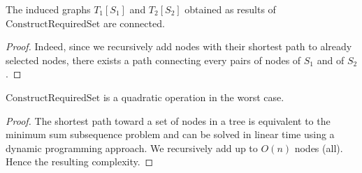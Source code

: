    			\begin{proposition}\label{prop:constructFuncConnected}
   				The induced graphs $T_1[S_1]$ and $T_2[S_2]$ obtained as results of $\text{ConstructRequiredSet}$ are connected.
   			\end{proposition}
   			\begin{proof}
   				Indeed, since we recursively add nodes with their shortest path to already selected nodes, there exists a path connecting every pairs of nodes of $S_1$ and of $S_2$.
   			\end{proof}
   
   			\begin{proposition}\label{prop:constructFuncQuadratic}
   				$\text{ConstructRequiredSet}$ is a quadratic operation in the worst case.
   			\end{proposition}
   			\begin{proof}
   				The shortest path toward a set of nodes in a tree is equivalent to the minimum sum subsequence problem and can be solved in linear time using a dynamic programming approach.
   				We recursively add up to $O(n)$ nodes (all).
   				Hence the resulting complexity.
   			\end{proof}
   
